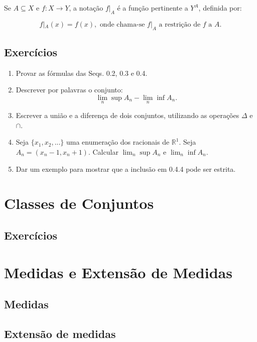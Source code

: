 \documentclass[
]{book}
\providecommand{\tightlist}{%
  \setlength{\itemsep}{0pt}\setlength{\parskip}{0pt}}
\begin{document}
Se \(A \subseteq X\) e \(f: X \to Y\), a notação \(f|_A\) é a função pertinente a \(Y^A\), definida por:

\[f|_A(x) = f(x), \text{ onde chama-se } f|_A \text{ a restrição de } f \text{ a } A.\]

\section*{Exercícios}\label{exercuxedcios}

\begin{enumerate}
\def\labelenumi{\arabic{enumi}.}
\tightlist
\item
  Provar as fórmulas das Seqs. 0.2, 0.3 e 0.4.
\item
  Descrever por palavras o conjunto: \[ \lim_n \sup A_n - \lim_n \inf A_n. \]
\item
  Escrever a união e a diferença de dois conjuntos, utilizando as operações \(\Delta\) e \(\cap\).
\item
  Seja \(\{x_1, x_2, ...\}\) uma enumeração dos racionais de \(\mathbb{R}^1\). Seja \(A_n = (x_n-1, x_n+1)\). Calcular \(\lim_n \sup A_n\) e \(\lim_n \inf A_n\).
\item
  Dar um exemplo para mostrar que a inclusão em 0.4.4 pode ser estrita.
\end{enumerate}

\chapter{Classes de Conjuntos}\label{classes-de-conjuntos}

\section*{Exercícios}\label{exercuxedcios-1}

\chapter{Medidas e Extensão de Medidas}\label{medidas-e-extensuxe3o-de-medidas}

\section{Medidas}\label{medidas}

\section{Extensão de medidas}\label{extensuxe3o-de-medidas}
\end{document}
